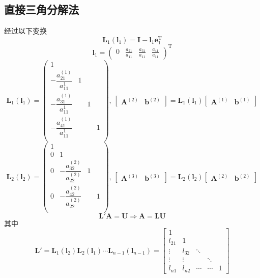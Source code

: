 \subsection{直接三角分解法}
经过以下变换
\[
    \boldsymbol{L}_{1}\left(\boldsymbol{l}_{1}\right)= \boldsymbol{I}-\boldsymbol{l}_{1}\boldsymbol{e}_{1}^{\mathrm{T}}
\]
\[
    \boldsymbol{l}_1 = \begin{pmatrix}
        0&\frac{a_{21}}{a_{11}} &\frac{a_{31}}{a_{11}} &\frac{a_{41}}{a_{11}}
    \end{pmatrix}^{\mathrm{T}}
\]
\[
    \boldsymbol{L}_{1}\left(\boldsymbol{l}_{1}\right)=
    \begin{pmatrix}
        1& & &\\
        -\dfrac{a_{21}^{(1)}}{a_{11}^1}& 1 & & \\
        -\dfrac{a_{31}^{(1)}}{a_{11}^1}& & 1 & \\
        -\dfrac{a_{41}^{(1)}}{a_{11}^1}& & & 1 \\
    \end{pmatrix}
    ,\,
    \begin{bmatrix}
        \boldsymbol{A}^{(2)} & \boldsymbol{b}^{(2)}
    \end{bmatrix}  = \boldsymbol{L}_{1}\left(\boldsymbol{l}_{1}\right) 
    \begin{bmatrix}
        \boldsymbol{A}^{(1)} & \boldsymbol{b}^{(1)}
    \end{bmatrix}
\]
\[
    \boldsymbol{L}_{2}\left(\boldsymbol{l}_{2}\right)=
    \begin{pmatrix}
        1 & & &\\
        0 & 1 & & \\
        0 &-\dfrac{a_{32}^{(2)}}{a_{22}^{(2)}}&1&  \\
        0 &-\dfrac{a_{42}^{(2)}}{a_{22}^{(2)}}&&1 \\
    \end{pmatrix}
    ,\,
    \begin{bmatrix}
        \boldsymbol{A}^{(3)} & \boldsymbol{b}^{(3)}
    \end{bmatrix}  = \boldsymbol{L}_{2}\left(\boldsymbol{l}_{2}\right) 
    \begin{bmatrix}
        \boldsymbol{A}^{(2)} & \boldsymbol{b}^{(2)}
    \end{bmatrix}
\]
\[
    \boldsymbol{L'A} = \boldsymbol{U}\Rightarrow\boldsymbol{A} = \boldsymbol{LU}
\]
其中
\[
    \boldsymbol{L}'=\boldsymbol{L}_1(\boldsymbol{l}_2)\boldsymbol{L}_2(\boldsymbol{l}_1)\cdots \boldsymbol{L}_{n-1}(\boldsymbol{l}_{n-1})=\begin{bmatrix}1&&&&\\l_{21}&1&&&\\\vdots&l_{32}&\ddots&&\\\vdots&\vdots&&\ddots&\\l_{n1}&l_{n2}&\cdots&\cdots&1\end{bmatrix}
\]
